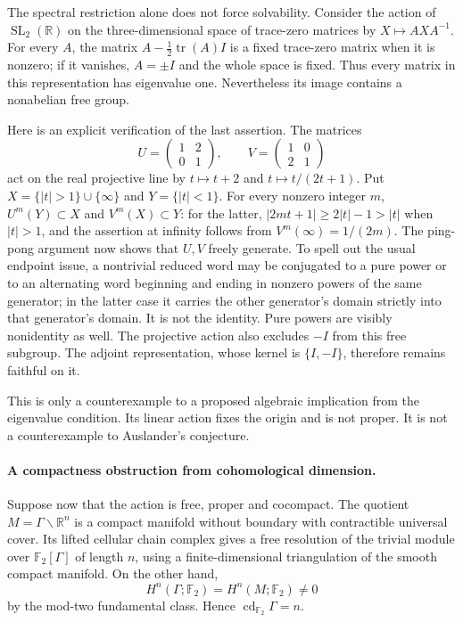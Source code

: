 \documentclass[11pt]{article}
\begin{document}
The spectral restriction alone does not force solvability. Consider the
action of $\operatorname{SL}_2(\mathbb R)$ on the three-dimensional
space of trace-zero matrices by $X\mapsto AXA^{-1}$. For every
$A$, the matrix $A-\tfrac12\operatorname{tr}(A)I$ is a fixed trace-zero
matrix when it is nonzero; if it vanishes, $A=\pm I$ and the whole
space is fixed. Thus every matrix in this representation has eigenvalue
one. Nevertheless its image contains a nonabelian free group.

Here is an explicit verification of the last assertion. The matrices
\[
 U=\begin{pmatrix}1&2\\0&1\end{pmatrix},\qquad
 V=\begin{pmatrix}1&0\\2&1\end{pmatrix}
\]
act on the real projective line by $t\mapsto t+2$ and
$t\mapsto t/(2t+1)$. Put $X=\{|t|>1\}\cup\{\infty\}$ and
$Y=\{|t|<1\}$. For every nonzero integer $m$,
$U^m(Y)\subset X$ and $V^m(X)\subset Y$: for the latter,
$|2mt+1|\geq2|t|-1>|t|$ when $|t|>1$, and the assertion at
infinity follows from $V^m(\infty)=1/(2m)$.
The ping-pong argument now shows that $U,V$ freely generate. To spell
out the usual endpoint issue, a nontrivial reduced word may be conjugated
to a pure power or to an alternating word beginning and ending in
nonzero powers of the same generator; in the latter case it carries
the other generator's domain strictly into that generator's domain.
It is not the identity. Pure powers are visibly nonidentity as well.
The projective action also excludes $-I$ from this free subgroup.
The adjoint representation, whose kernel is $\{I,-I\}$, therefore
remains faithful on it.

This is only a counterexample to a proposed algebraic implication from
the eigenvalue condition. Its linear action fixes the origin and is
not proper. It is not a counterexample to Auslander's conjecture.

\paragraph{A compactness obstruction from cohomological dimension.}
Suppose now that the action is free, proper and cocompact. The quotient
$M=\Gamma\backslash\mathbb R^n$ is a compact manifold without boundary
with contractible universal cover. Its lifted cellular chain complex
gives a free resolution of the trivial module over
$\mathbb F_2[\Gamma]$ of length $n$, using a finite-dimensional
triangulation of the smooth compact manifold. On the other hand,
\[
 H^n(\Gamma;\mathbb F_2)=H^n(M;\mathbb F_2)\ne0
\]
by the mod-two fundamental class. Hence
$\operatorname{cd}_{\mathbb F_2}\Gamma=n$.
\end{document}
